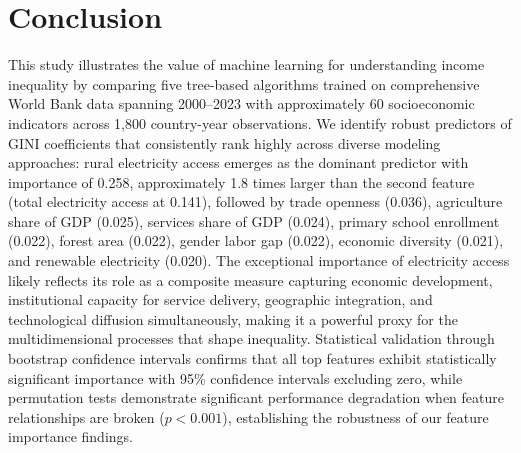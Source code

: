 \documentclass[10pt,twocolumn]{article}
\begin{document}
\section{Conclusion}
\label{sec:conclusion}
\par This study illustrates the value of machine learning for understanding income inequality by comparing five tree-based algorithms trained on comprehensive World Bank data spanning 2000--2023 with approximately 60 socioeconomic indicators across 1,800 country-year observations. We identify robust predictors of GINI coefficients that consistently rank highly across diverse modeling approaches: rural electricity access emerges as the dominant predictor with importance of 0.258, approximately 1.8 times larger than the second feature (total electricity access at 0.141), followed by trade openness (0.036), agriculture share of GDP (0.025), services share of GDP (0.024), primary school enrollment (0.022), forest area (0.022), gender labor gap (0.022), economic diversity (0.021), and renewable electricity (0.020). The exceptional importance of electricity access likely reflects its role as a composite measure capturing economic development, institutional capacity for service delivery, geographic integration, and technological diffusion simultaneously, making it a powerful proxy for the multidimensional processes that shape inequality. Statistical validation through bootstrap confidence intervals confirms that all top features exhibit statistically significant importance with 95\% confidence intervals excluding zero, while permutation tests demonstrate significant performance degradation when feature relationships are broken ($p < 0.001$), establishing the robustness of our feature importance findings.
\end{document}
